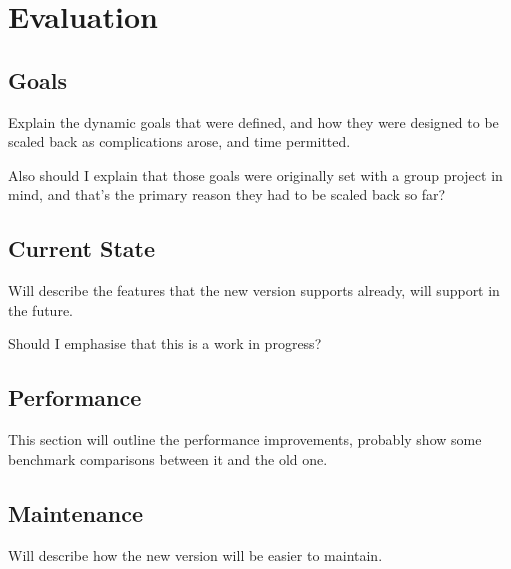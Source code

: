 \chapter{Evaluation}\label{ch:eval}

\section{Goals}
Explain the dynamic goals that were defined, and how they were designed to be scaled back as complications arose, and time permitted. 

Also should I explain that those goals were originally set with a group project in mind, and that's the primary reason they had to be scaled back so far?

\section{Current State}
Will describe the features that the new version supports already, will support in the future.

Should I emphasise that this is a work in progress?

\section{Performance}
This section will outline the performance improvements, probably show some benchmark comparisons between it and the old one.

\section{Maintenance}
Will describe how the new version will be easier to maintain.